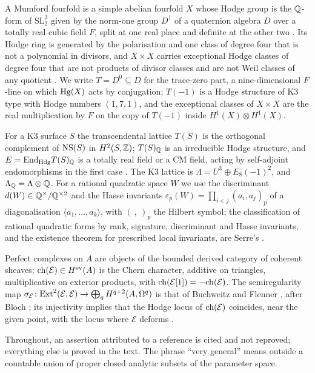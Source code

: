 A Mumford fourfold is a simple abelian fourfold $X$ whose Hodge group is the $\mathbb{Q}$-form of $\mathrm{SL}_{2}^{3}$ given by the norm-one group $D^{1}$ of a quaternion algebra $D$ over a totally real cubic field $F$, split at one real place and definite at the other two \cite{Mum69}. Its Hodge ring is generated by the polarisation and one class of degree four that is not a polynomial in divisors, and $X\times X$ carries exceptional Hodge classes of degree four that are not products of divisor classes and are not Weil classes of any quotient \cite{MZ95,BMB26}. We write $T=D^{0}\subseteq D$ for the trace-zero part, a nine-dimensional $F$-line on which $\mathrm{Hg}(X)$ acts by conjugation; $T(-1)$ is a Hodge structure of K3 type with Hodge numbers $(1,7,1)$, and the exceptional classes of $X\times X$ are the real multiplication by $F$ on the copy of $T(-1)$ inside $H^{1}(X)\otimes H^{1}(X)$.

For a K3 surface $S$ the transcendental lattice $T(S)$ is the orthogonal complement of $\mathrm{NS}(S)$ in $H^{2}(S,\mathbb{Z})$; $T(S)_{\mathbb{Q}}$ is an irreducible Hodge structure, and $E=\mathrm{End}_{\mathrm{Hdg}}T(S)_{\mathbb{Q}}$ is a totally real field or a CM field, acting by self-adjoint endomorphisms in the first case \cite{Zar83}. The K3 lattice is $\Lambda=U^{3}\oplus E_{8}(-1)^{2}$, and $\Lambda_{\mathbb{Q}}=\Lambda\otimes\mathbb{Q}$. For a rational quadratic space $W$ we use the discriminant $d(W)\in\mathbb{Q}^{\times}/\mathbb{Q}^{\times2}$ and the Hasse invariants $\varepsilon_{p}(W)=\prod_{i<j}(a_{i},a_{j})_{p}$ of a diagonalisation $\langle a_{1},\dots,a_{k}\rangle$, with $(\ ,\ )_{p}$ the Hilbert symbol; the classification of rational quadratic forms by rank, signature, discriminant and Hasse invariants, and the existence theorem for prescribed local invariants, are Serre's \cite[Chap.~IV]{Ser73}.

Perfect complexes on $A$ are objects of the bounded derived category of coherent sheaves; $\mathrm{ch}(\mathcal{E})\in H^{\mathrm{ev}}(A)$ is the Chern character, additive on triangles, multiplicative on exterior products, with $\mathrm{ch}(\mathcal{E}[1])=-\mathrm{ch}(\mathcal{E})$. The semiregularity map $\sigma_{\mathcal{E}}\colon\mathrm{Ext}^{2}(\mathcal{E},\mathcal{E})\to\bigoplus_{q}H^{q+2}(A,\Omega^{q})$ is that of Buchweitz and Flenner \cite{BF03}, after Bloch \cite{Blo72}; its injectivity implies that the Hodge locus of $\mathrm{ch}(\mathcal{E})$ coincides, near the given point, with the locus where $\mathcal{E}$ deforms \cite{BF03,Pri24}.

Throughout, an assertion attributed to a reference is cited and not reproved; everything else is proved in the text. The phrase ``very general'' means outside a countable union of proper closed analytic subsets of the parameter space.
